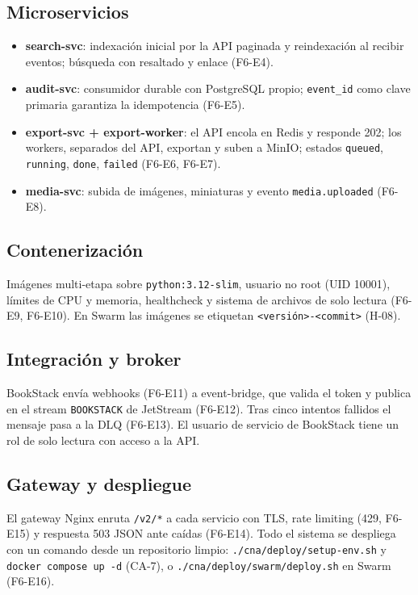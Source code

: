 \documentclass[11pt,a4paper]{article}
\begin{document}
\subsection{Microservicios}
\begin{itemize}
  \item \textbf{search-svc}: indexación inicial por la API paginada y reindexación al recibir eventos; búsqueda con resaltado y enlace (F6-E4).
  \item \textbf{audit-svc}: consumidor durable con PostgreSQL propio; \texttt{event\_id} como clave primaria garantiza la idempotencia (F6-E5).
  \item \textbf{export-svc + export-worker}: el API encola en Redis y responde 202; los workers, separados del API, exportan y suben a MinIO; estados \texttt{queued}, \texttt{running}, \texttt{done}, \texttt{failed} (F6-E6, F6-E7).
  \item \textbf{media-svc}: subida de imágenes, miniaturas y evento \texttt{media.uploaded} (F6-E8).
\end{itemize}

\subsection{Contenerización}
Imágenes multi-etapa sobre \texttt{python:3.12-slim}, usuario no root (UID 10001), límites de CPU y memoria, healthcheck y sistema de archivos de solo lectura (F6-E9, F6-E10). En Swarm las imágenes se etiquetan \texttt{<versión>-<commit>} (H-08).

\subsection{Integración y broker}
BookStack envía webhooks (F6-E11) a event-bridge, que valida el token y publica en el stream \texttt{BOOKSTACK} de JetStream (F6-E12). Tras cinco intentos fallidos el mensaje pasa a la DLQ (F6-E13). El usuario de servicio de BookStack tiene un rol de solo lectura con acceso a la API.

\subsection{Gateway y despliegue}
El gateway Nginx enruta \texttt{/v2/*} a cada servicio con TLS, rate limiting (429, F6-E15) y respuesta 503 JSON ante caídas (F6-E14). Todo el sistema se despliega con un comando desde un repositorio limpio: \texttt{./cna/deploy/setup-env.sh} y \texttt{docker compose up -d} (CA-7), o \texttt{./cna/deploy/swarm/deploy.sh} en Swarm (F6-E16).
\end{document}
